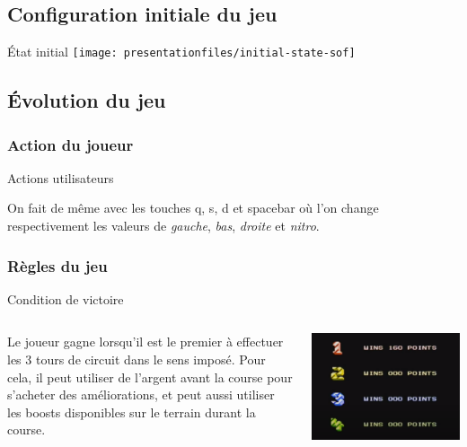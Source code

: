 \documentclass[10pt,dvipsnames,final]{beamer}
\newcommand{\midcolumn}[2]{
\begin{columns}
	\begin{column}{0.5\textwidth}
		#1
	\end{column}
	\begin{column}{0.5\textwidth}
		#2
	\end{column}
\end{columns}
}
\begin{document}
\subsection{Configuration initiale du jeu}

\begin{frame}{État initial}
\texttt{[image: presentationfiles/initial-state-sof]} 
\end{frame}

\subsection{Évolution du jeu}

\subsubsection{Action du joueur}

\begin{frame}{Actions utilisateurs}


On fait de même avec les touches q, s, d et spacebar où l'on change respectivement les valeurs de \emph{gauche}, \emph{bas}, \emph{droite} et \emph{nitro}.


\end{frame}

\subsubsection{Règles du jeu}

\begin{frame}{Condition de victoire}
\midcolumn{Le joueur gagne lorsqu'il est le premier à effectuer les 3 tours de circuit dans le sens imposé. Pour cela, il peut utiliser de l'argent avant la course pour s'acheter des améliorations, et peut aussi utiliser les boosts disponibles sur le terrain durant la course.}{\includegraphics[width=\textwidth]{presentationfiles/fin_partie}} 
\end{frame}
\end{document}
